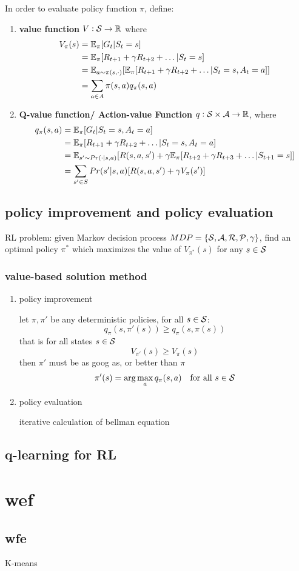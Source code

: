 \documentclass[11pt]{article}
\begin{document}
In order to evaluate policy function \(\pi\), define:
\begin{enumerate}
\item \textbf{value function} \(V:\mathcal{S}\to\mathbb{R}\) where 
\begin{align*}
V_\pi(s)&=\mathbb{E}_\pi[G_t|S_t=s]\\
&=\mathbb{E}_\pi[R_{t+1}+\gamma R_{t+2}+\dots|S_t=s]\\
&=\mathbb{E}_{a\sim\pi(s,\cdot)}[\mathbb{E}_\pi[R_{t+1}+\gamma R_{t+2}+\dots|S_t=s,A_t=a]]\\
&=\displaystyle\sum_{a\in A}\pi(s,a)q_\pi(s,a)
\end{align*}
\item \textbf{Q-value function/ Action-value Function} \(q:\mathcal{S}\times\mathcal{A}\to\mathbb{R}\), where
\begin{align*}
q_\pi(s,a)&=\mathbb{E}_\pi[G_t|S_t=s,A_t=a]\\
&=\mathbb{E}_\pi[R_{t+1}+\gamma R_{t+2}+\dots|S_t=s,A_t=a]\\
&=\mathbb{E}_{s'\sim Pr(\cdot|s,a)}[R(s,a,s')+\gamma
\mathbb{E}_\pi[R_{t+2}+\gamma R_{t+3}+\dots|S_{t+1}=s]]\\
&=\displaystyle\sum_{s'\in S}Pr(s'|s,a)[R(s,a,s')+\gamma V_\pi(s')]
\end{align*}
\end{enumerate}
\subsection{policy improvement and policy evaluation}
\label{sec:org8fff090}
RL problem: given Markov decision process
\(MDP=\{\mathcal{S},\mathcal{A},\mathcal{R},\mathcal{P},\gamma\}\), find an optimal policy \(\pi^*\)
which maximizes the value of \(V_{\pi^*}(s)\) for any \(s\in\mathcal{S}\)
\subsubsection{value-based solution method}
\label{sec:org83511fa}
\begin{enumerate}
\item policy improvement

let \(\pi,\pi'\) be any deterministic policies, for all \(s\in\mathcal{S}\):
\begin{equation*}
q_\pi(s,\pi'(s))\ge q_\pi(s,\pi(s))
\end{equation*}
that is for all states \(s\in\mathcal{S}\)
\begin{equation*}
V_{\pi'}(s)\ge V_\pi(s)
\end{equation*}
then \(\pi'\) must be as goog as, or better than \(\pi\)
\begin{equation*}
\pi'(s)=\arg\max_aq_\pi(s,a)\quad \text{for all } s\in\mathcal{S}
\end{equation*}
\item policy evaluation

iterative calculation of bellman equation
\end{enumerate}
\subsection{q-learning for RL}
\label{sec:org6c1a952}
\section{wef}
\label{sec:org9a4416f}
\subsection{wfe}
\label{sec:orgb2dbae5}
K-means
\end{document}
